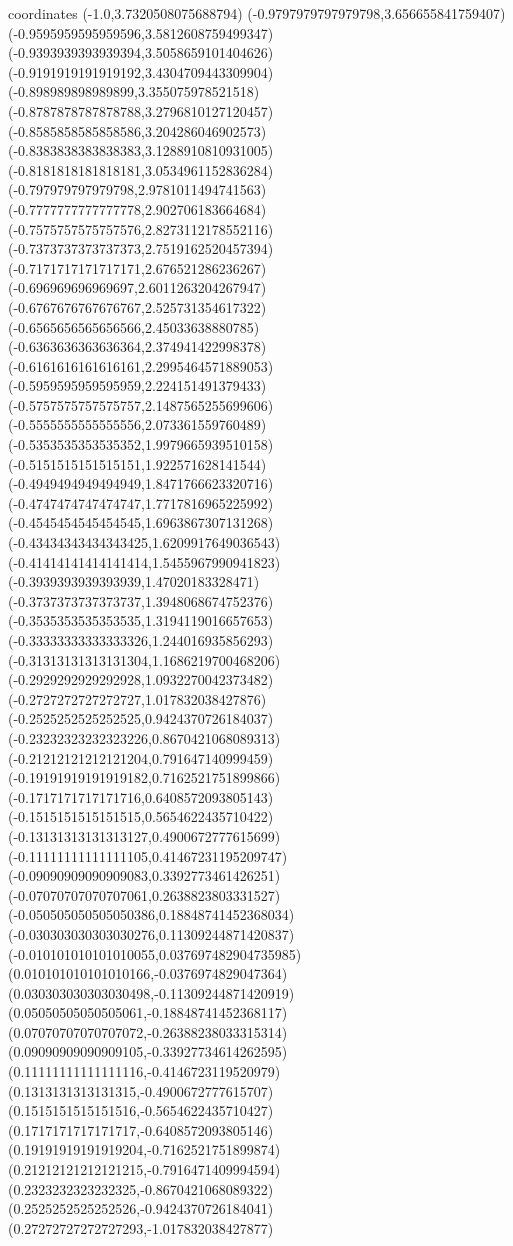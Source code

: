 coordinates {%
(-1.0,3.7320508075688794)
(-0.9797979797979798,3.656655841759407)
(-0.9595959595959596,3.5812608759499347)
(-0.9393939393939394,3.5058659101404626)
(-0.9191919191919192,3.4304709443309904)
(-0.898989898989899,3.355075978521518)
(-0.8787878787878788,3.2796810127120457)
(-0.8585858585858586,3.204286046902573)
(-0.8383838383838383,3.1288910810931005)
(-0.8181818181818181,3.0534961152836284)
(-0.797979797979798,2.9781011494741563)
(-0.7777777777777778,2.902706183664684)
(-0.7575757575757576,2.8273112178552116)
(-0.7373737373737373,2.7519162520457394)
(-0.7171717171717171,2.676521286236267)
(-0.696969696969697,2.6011263204267947)
(-0.6767676767676767,2.525731354617322)
(-0.6565656565656566,2.45033638880785)
(-0.6363636363636364,2.374941422998378)
(-0.6161616161616161,2.2995464571889053)
(-0.5959595959595959,2.224151491379433)
(-0.5757575757575757,2.1487565255699606)
(-0.5555555555555556,2.073361559760489)
(-0.5353535353535352,1.9979665939510158)
(-0.5151515151515151,1.922571628141544)
(-0.4949494949494949,1.8471766623320716)
(-0.4747474747474747,1.7717816965225992)
(-0.4545454545454545,1.6963867307131268)
(-0.43434343434343425,1.6209917649036543)
(-0.41414141414141414,1.5455967990941823)
(-0.3939393939393939,1.47020183328471)
(-0.3737373737373737,1.3948068674752376)
(-0.3535353535353535,1.3194119016657653)
(-0.33333333333333326,1.244016935856293)
(-0.31313131313131304,1.1686219700468206)
(-0.2929292929292928,1.0932270042373482)
(-0.2727272727272727,1.017832038427876)
(-0.2525252525252525,0.9424370726184037)
(-0.23232323232323226,0.8670421068089313)
(-0.21212121212121204,0.791647140999459)
(-0.19191919191919182,0.7162521751899866)
(-0.1717171717171716,0.6408572093805143)
(-0.1515151515151515,0.5654622435710422)
(-0.13131313131313127,0.4900672777615699)
(-0.11111111111111105,0.41467231195209747)
(-0.09090909090909083,0.3392773461426251)
(-0.07070707070707061,0.2638823803331527)
(-0.050505050505050386,0.18848741452368034)
(-0.030303030303030276,0.11309244871420837)
(-0.010101010101010055,0.037697482904735985)
(0.010101010101010166,-0.0376974829047364)
(0.030303030303030498,-0.11309244871420919)
(0.05050505050505061,-0.18848741452368117)
(0.07070707070707072,-0.26388238033315314)
(0.09090909090909105,-0.33927734614262595)
(0.11111111111111116,-0.4146723119520979)
(0.1313131313131315,-0.4900672777615707)
(0.1515151515151516,-0.5654622435710427)
(0.1717171717171717,-0.6408572093805146)
(0.19191919191919204,-0.7162521751899874)
(0.21212121212121215,-0.7916471409994594)
(0.2323232323232325,-0.8670421068089322)
(0.2525252525252526,-0.9424370726184041)
(0.27272727272727293,-1.017832038427877)
}

